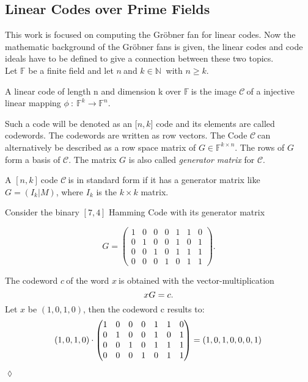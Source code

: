    

\newpage

\subsection{Linear Codes over Prime Fields}
\label{subsec:linearcodes}
This work is focused on computing the Gröbner fan for linear codes. Now the mathematic background of the Gröbner fans is given, the linear codes and code ideals have to be defined to give a connection between these two topics.\\ 
Let $\mathbb{F}$ be a finite field and let $n~$and $k\in \mathbb{N}~$ with $n\geq k$.
\begin{env_definition}
\cite{dueckjournal} A linear code of length n and dimension k over $\mathbb{F}~$is the image $\mathcal{C}~$of a injective linear mapping $\phi~:~\mathbb{F}^{k} \rightarrow \mathbb{F}^{n}.$
\end{env_definition} 
Such a code will be denoted as an [$n,k$] code and its elements are called codewords. The codewords are written 
as row vectors. The Code $\mathcal{C}~$can alternatively be described as a row space matrix of $G \in \mathbb{F}^{k \times n}$. The rows of $G$ form a basis of $\mathcal{C}$.
The matrix $G$ is also called \textit{generator matrix} for $\mathcal{C}$.
\begin{env_definition}
\cite{dueckjournal}
A $[n,k]~$code $\mathcal{C}~$is in standard form if it has a generator matrix like $G = (I_{k}| M)$, where $I_{k}$ is the $k \times k$ matrix.
\end{env_definition}


\begin{env_example}\normalfont
Consider the binary $[7,4]$ Hamming Code with its generator matrix

\[
G =
\begin{pmatrix}
1 & 0 & 0 & 0 & 1 & 1 & 0 \\ 
0 & 1 & 0 & 0 & 1 & 0 & 1 \\  
0 & 0 & 1 & 0 & 1 & 1 & 1 \\ 
0 & 0 & 0 & 1 & 0 & 1 & 1
\end{pmatrix} 
.\]

The codeword $c~$of the word $x~$is obtained with the vector-multiplication
\[
     xG = c. \\
 \]
 Let $x$ be $\left(1,0,1,0\right)$, then the codeword c results to:
 \[
      \left(1,0,1,0\right) \cdot \begin{pmatrix}
      1 & 0 & 0 & 0 & 1 & 1 & 0 \\ 
      0 & 1 & 0 & 0 & 1 & 0 & 1 \\  
      0 & 0 & 1 & 0 & 1 & 1 & 1 \\ 
      0 & 0 & 0 & 1 & 0 & 1 & 1
      \end{pmatrix}   = \left(1,0,1,0,0,0,1\right) \\
  \]
\begin{flushright}
$\lozenge$
\end{flushright} 

\end{env_example}

